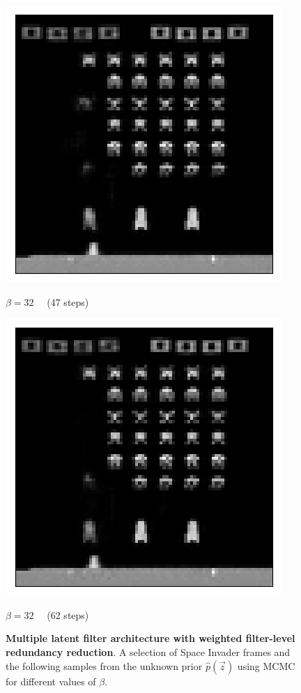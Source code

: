 \begin{figure}[h!]
\begin{multicols}{4}
    \includegraphics[scale=0.4]{figures/results/weighted_average/beta_32_posterior_sample_47.png}
    \caption{$\beta=32\quad$ (47 steps)}
    \includegraphics[scale=0.4]{figures/results/weighted_average/beta_32_posterior_sample_62.png}
    \caption{$\beta=32\quad$ (62 steps)}
\end{multicols}

\caption{\textbf{Multiple latent filter architecture with weighted filter-level redundancy reduction}. A selection of Space Invader frames and the following samples from the unknown prior $\hat{p}(\vec{z})$ using MCMC for different values of $\beta$.}
\label{fig:weighted_average_posterior_samples}
\end{figure}



